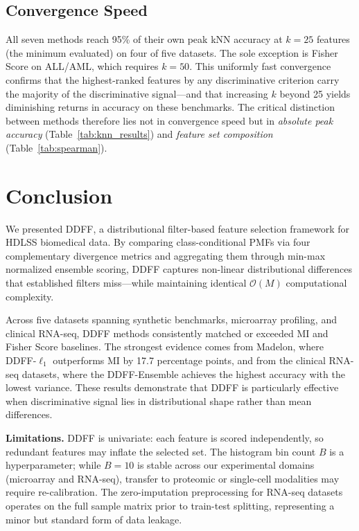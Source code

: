\documentclass[conference]{IEEEtran}
\begin{document}
\subsection{Convergence Speed}

All seven methods reach 95\% of their own peak kNN accuracy at $k = 25$ features (the minimum evaluated) on four of five datasets. The sole exception is Fisher Score on ALL/AML, which requires $k = 50$. This uniformly fast convergence confirms that the highest-ranked features by any discriminative criterion carry the majority of the discriminative signal---and that increasing $k$ beyond 25 yields diminishing returns in accuracy on these benchmarks. The critical distinction between methods therefore lies not in convergence speed but in \emph{absolute peak accuracy} (Table~\ref{tab:knn_results}) and \emph{feature set composition} (Table~\ref{tab:spearman}).

\section{Conclusion}
\label{sec:conclusion}

We presented DDFF, a distributional filter-based feature selection framework for HDLSS biomedical data. By comparing class-conditional PMFs via four complementary divergence metrics and aggregating them through min-max normalized ensemble scoring, DDFF captures non-linear distributional differences that established filters miss---while maintaining identical $\mathcal{O}(M)$ computational complexity.

Across five datasets spanning synthetic benchmarks, microarray profiling, and clinical RNA-seq, DDFF methods consistently matched or exceeded MI and Fisher Score baselines. The strongest evidence comes from Madelon, where DDFF-$\ell_1$ outperforms MI by 17.7 percentage points, and from the clinical RNA-seq datasets, where the DDFF-Ensemble achieves the highest accuracy with the lowest variance. These results demonstrate that DDFF is particularly effective when discriminative signal lies in distributional shape rather than mean differences.

\textbf{Limitations.} DDFF is univariate: each feature is scored independently, so redundant features may inflate the selected set. The histogram bin count $B$ is a hyperparameter; while $B{=}10$ is stable across our experimental domains (microarray and RNA-seq), transfer to proteomic or single-cell modalities may require re-calibration. The zero-imputation preprocessing for RNA-seq datasets operates on the full sample matrix prior to train-test splitting, representing a minor but standard form of data leakage.
\end{document}
